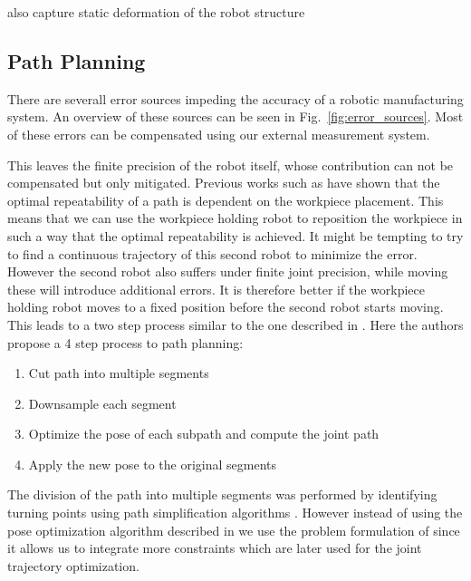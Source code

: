 \documentclass[5p,times,procedia]{elsarticle}
\begin{document}
also capture static deformation of the robot structure


\subsection{Path Planning}
There are severall error sources impeding the accuracy of a robotic manufacturing system.
An overview of these sources can be seen in Fig.~\ref{fig:error_sources}.
Most of these errors can be compensated using our external measurement system.

This leaves the finite precision of the robot itself, whose contribution can not be compensated but only mitigated.
Previous works such as \cite{previous_work} have shown that the optimal repeatability of a path is dependent on the workpiece placement.
This means that we can use the workpiece holding robot to reposition the workpiece in such a way that the optimal repeatability is achieved.
It might be tempting to try to find a continuous trajectory of this second robot to minimize the error.
However the second robot also suffers under finite joint precision, while moving these will introduce additional errors.
It is therefore better if the workpiece holding robot moves to a fixed position before the second robot starts moving.
This leads to a two step process similar to the one described in \cite{stroke_division}.
Here the authors propose a 4 step process to path planning:
\begin{enumerate}
	\item Cut path into multiple segments
	\item Downsample each segment
	\item Optimize the pose of each subpath and compute the joint path
	\item Apply the new pose to the original segments
\end{enumerate}
The division of the path into multiple segments was performed by identifying turning points using path simplification algorithms \cite{stroke_division}.
However instead of using the pose optimization algorithm described in \cite{stroke_division} we use the problem formulation of \cite{previous_work} since it allows us to integrate more constraints which are later used for the joint trajectory optimization.
\end{document}
